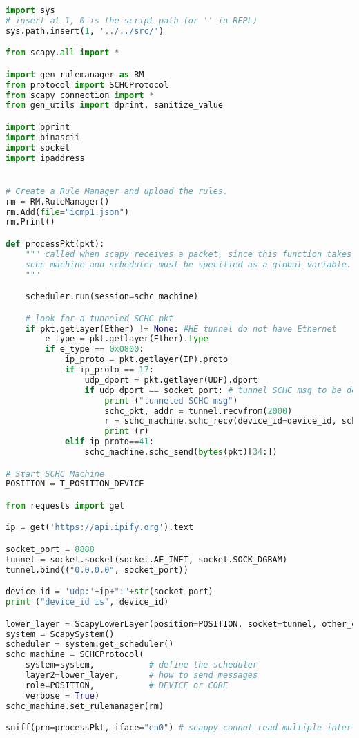 \begin{lstlisting}[language=Python, caption={Program ping\_device1.py}, label=prog-ping-device1, basicstyle=\ttfamily\scriptsize]
import sys
# insert at 1, 0 is the script path (or '' in REPL)
sys.path.insert(1, '../../src/')

from scapy.all import *

import gen_rulemanager as RM
from protocol import SCHCProtocol
from scapy_connection import *
from gen_utils import dprint, sanitize_value

import pprint
import binascii
import socket
import ipaddress


# Create a Rule Manager and upload the rules.
rm = RM.RuleManager()
rm.Add(file="icmp1.json")
rm.Print()

def processPkt(pkt):
    """ called when scapy receives a packet, since this function takes only one argument,
    schc_machine and scheduler must be specified as a global variable.
    """

    scheduler.run(session=schc_machine)

    # look for a tunneled SCHC pkt
    if pkt.getlayer(Ether) != None: #HE tunnel do not have Ethernet
        e_type = pkt.getlayer(Ether).type
        if e_type == 0x0800:
            ip_proto = pkt.getlayer(IP).proto
            if ip_proto == 17:
                udp_dport = pkt.getlayer(UDP).dport
                if udp_dport == socket_port: # tunnel SCHC msg to be decompressed
                    print ("tunneled SCHC msg")                    
                    schc_pkt, addr = tunnel.recvfrom(2000)
                    r = schc_machine.schc_recv(device_id=device_id, schc_packet=schc_pkt)
                    print (r)
            elif ip_proto==41:
                schc_machine.schc_send(bytes(pkt)[34:])

# Start SCHC Machine
POSITION = T_POSITION_DEVICE

from requests import get

ip = get('https://api.ipify.org').text

socket_port = 8888
tunnel = socket.socket(socket.AF_INET, socket.SOCK_DGRAM)
tunnel.bind(("0.0.0.0", socket_port))

device_id = 'udp:'+ip+":"+str(socket_port)
print ("device_id is", device_id)

lower_layer = ScapyLowerLayer(position=POSITION, socket=tunnel, other_end=None)
system = ScapySystem()
scheduler = system.get_scheduler()
schc_machine = SCHCProtocol(
    system=system,           # define the scheduler
    layer2=lower_layer,      # how to send messages
    role=POSITION,           # DEVICE or CORE
    verbose = True)         
schc_machine.set_rulemanager(rm)

sniff(prn=processPkt, iface="en0") # scappy cannot read multiple interfaces

\end{lstlisting}

